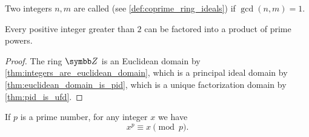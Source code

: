 \begin{definition}\label{def:coprime_numbers}
  Two integers \( n, m \) are called  (see \cref{def:coprime_ring_ideals}) if \( \gcd(n, m) = 1 \).
\end{definition}

\begin{theorem}\label{thm:fundamental_theorem_of_arithmetic}
  Every positive integer greater than \( 2 \) can be factored into a product of prime powers.
\end{theorem}
\begin{proof}
  The ring \( \Z \) is an Euclidean domain by \cref{thm:integers_are_euclidean_domain}, which is a principal ideal domain by \cref{thm:euclidean_domain_is_pid}, which is a unique factorization domain by \cref{thm:pid_is_ufd}.
\end{proof}

\begin{proposition}\label{thm:fermats_little_theorem}
  If \( p \) is a prime number, for any integer \( x \) we have
  \begin{equation*}
    x^p \equiv x \pmod p.
  \end{equation*}
\end{proposition}
